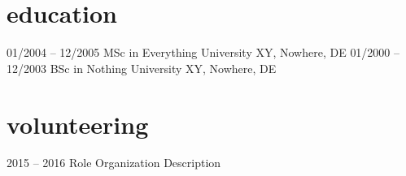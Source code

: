 \documentclass[]{friggeri-minimal-cv}
\begin{document}
\section{education}

\begin{entrylist}
  \monthentry
    {01/2004 -- 12/2005}
    {MSc in Everything }
    {University XY, Nowhere, DE}
    {}
  \shortmonthentry
    {01/2000 -- 12/2003}
    {BSc in Nothing}
    {University XY, Nowhere, DE}
\end{entrylist}

\section{volunteering}

\begin{entrylist}
  \yearentry
    {2015 -- 2016}
    {Role}
    {Organization}
    {Description}
\end{entrylist}
\end{document}
